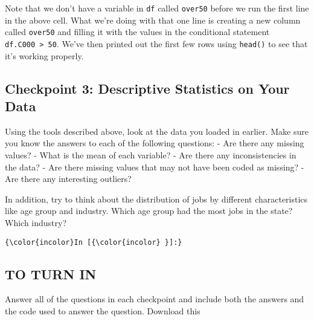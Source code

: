\documentclass[11pt]{article}
\begin{document}
    Note that we don't have a variable in \texttt{df} called \texttt{over50}
before we run the first line in the above cell. What we're doing with
that one line is creating a new column called \texttt{over50} and
filling it with the values in the conditional statement
\texttt{df.C000\ \textgreater{}\ 50}. We've then printed out the first
few rows using \texttt{head()} to see that it's working properly.

    \hypertarget{checkpoint-3-descriptive-statistics-on-your-data}{%
\subsection{\texorpdfstring{{Checkpoint 3: Descriptive Statistics on
Your
Data}}{Checkpoint 3: Descriptive Statistics on Your Data}}\label{checkpoint-3-descriptive-statistics-on-your-data}}

Using the tools described above, look at the data you loaded in earlier.
Make sure you know the answers to each of the following questions: - Are
there any missing values? - What is the mean of each variable? - Are
there any inconsistencies in the data? - Are there missing values that
may not have been coded as missing? - Are there any interesting
outliers?

In addition, try to think about the distribution of jobs by different
characteristics like age group and industry. Which age group had the
most jobs in the state? Which industry?

    \begin{Verbatim}[commandchars=\\\{\}]
{\color{incolor}In [{\color{incolor} }]:} 
\end{Verbatim}


    \hypertarget{to-turn-in}{%
\subsection{\texorpdfstring{{TO TURN
IN}}{TO TURN IN}}\label{to-turn-in}}

Answer all of the questions in each checkpoint and include both the
answers and the code used to answer the question. Download this


    
    
    
    
\end{document}

